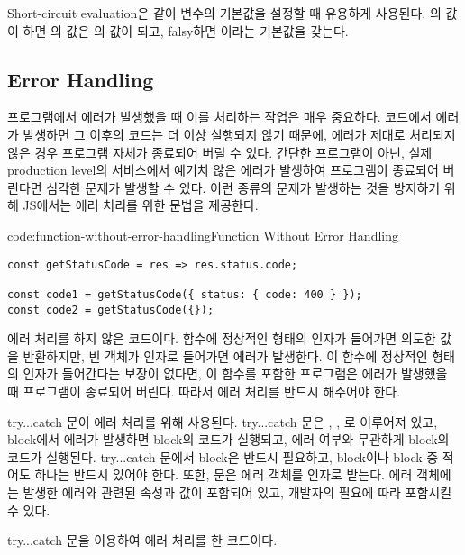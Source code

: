 Short-circuit evaluation은 \과 같이 변수의 기본값을 설정할 때 유용하게 사용된다. 의 값이 하면 의 값은 의 값이 되고, falsy하면 이라는 기본값을 갖는다.

\subsection*{Error Handling}

프로그램에서 에러가 발생했을 때 이를 처리하는 작업은 매우 중요하다. 코드에서 에러가 발생하면 그 이후의 코드는 더 이상 실행되지 않기 때문에, 에러가 제대로 처리되지 않은 경우 프로그램 자체가 종료되어 버릴 수 있다. 간단한 프로그램이 아닌, 실제 production level의 서비스에서 예기치 않은 에러가 발생하여 프로그램이 종료되어 버린다면 심각한 문제가 발생할 수 있다. 이런 종류의 문제가 발생하는 것을 방지하기 위해 JS에서는 에러 처리를 위한 문법을 제공한다.

\begin{codeenv}{code:function-without-error-handling}{Function Without Error Handling}\begin{verbatim}
const getStatusCode = res => res.status.code;

const code1 = getStatusCode({ status: { code: 400 } });
const code2 = getStatusCode({});
\end{verbatim}
\end{codeenv}

\은 에러 처리를 하지 않은 코드이다.  함수에 정상적인 형태의 인자가 들어가면 의도한 값을 반환하지만, 빈 객체가 인자로 들어가면 에러가 발생한다. 이 함수에 정상적인 형태의 인자가 들어간다는 보장이 없다면, 이 함수를 포함한 프로그램은 에러가 발생했을 때 프로그램이 종료되어 버린다. 따라서 에러 처리를 반드시 해주어야 한다.

try...catch 문이 에러 처리를 위해 사용된다. try...catch 문은 , , 로 이루어져 있고,  block에서 에러가 발생하면  block의 코드가 실행되고, 에러 여부와 무관하게  block의 코드가 실행된다. try...catch 문에서  block은 반드시 필요하고,  block이나  block 중 적어도 하나는 반드시 있어야 한다. 또한,  문은 에러 객체를 인자로 받는다. 에러 객체에는 발생한 에러와 관련된 속성과 값이 포함되어 있고, 개발자의 필요에 따라 포함시킬 수 있다.

\은 try...catch 문을 이용하여 에러 처리를 한 코드이다.

